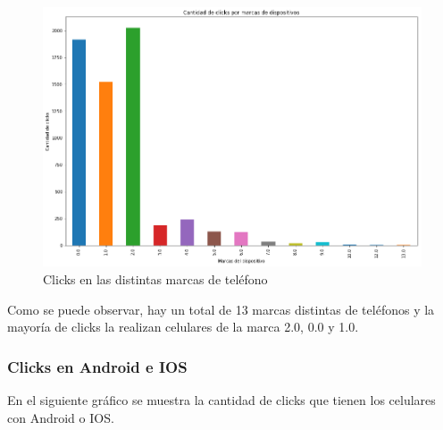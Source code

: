 \documentclass[a4paper, 12pt]{article}
\begin{document}
		\FloatBarrier
		\begin{figure}[h]
			\centering
			\includegraphics[width=\textwidth]{images/clicks/clicks_brand.png}
			\caption{Clicks en las distintas marcas de teléfono}
		\end{figure}
		\FloatBarrier

		 Como se puede observar, hay un total de 13 marcas distintas de teléfonos y la mayoría de clicks la realizan
		celulares de la marca 2.0, 0.0 y 1.0.

	\subsubsection{Clicks en Android e IOS}
		 En el siguiente gráfico se muestra la cantidad de clicks que tienen los celulares con Android o IOS.
\end{document}
